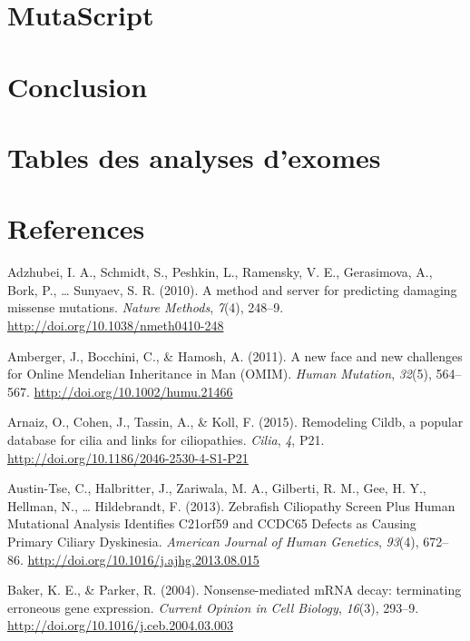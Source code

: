 \documentclass[12pt,twoside]{reedthesis}
\theoremstyle{definition}
\theoremstyle{definition}
\theoremstyle{remark}
\begin{document}
  \chapter{MutaScript}\label{mutascript}
  
  \chapter*{Conclusion}\label{conclusion-1}
  
  \chapter{Tables des analyses d'exomes}\label{sssdd}
  
  \chapter*{References}\label{references}
  
  \hypertarget{refs}{}
  \hypertarget{ref-Adzhubei2010}{}
  Adzhubei, I. A., Schmidt, S., Peshkin, L., Ramensky, V. E., Gerasimova,
  A., Bork, P., \ldots{} Sunyaev, S. R. (2010). A method and server for
  predicting damaging missense mutations. \emph{Nature Methods},
  \emph{7}(4), 248--9. \url{http://doi.org/10.1038/nmeth0410-248}
  
  \hypertarget{ref-Amberger2011}{}
  Amberger, J., Bocchini, C., \& Hamosh, A. (2011). A new face and new
  challenges for Online Mendelian Inheritance in Man (OMIM). \emph{Human
  Mutation}, \emph{32}(5), 564--567.
  \url{http://doi.org/10.1002/humu.21466}
  
  \hypertarget{ref-Arnaiz2015}{}
  Arnaiz, O., Cohen, J., Tassin, A., \& Koll, F. (2015). Remodeling Cildb,
  a popular database for cilia and links for ciliopathies. \emph{Cilia},
  \emph{4}, P21. \url{http://doi.org/10.1186/2046-2530-4-S1-P21}
  
  \hypertarget{ref-Austin-Tse2013}{}
  Austin-Tse, C., Halbritter, J., Zariwala, M. A., Gilberti, R. M., Gee,
  H. Y., Hellman, N., \ldots{} Hildebrandt, F. (2013). Zebrafish
  Ciliopathy Screen Plus Human Mutational Analysis Identifies C21orf59 and
  CCDC65 Defects as Causing Primary Ciliary Dyskinesia. \emph{American
  Journal of Human Genetics}, \emph{93}(4), 672--86.
  \url{http://doi.org/10.1016/j.ajhg.2013.08.015}
  
  \hypertarget{ref-Baker2004}{}
  Baker, K. E., \& Parker, R. (2004). Nonsense-mediated mRNA decay:
  terminating erroneous gene expression. \emph{Current Opinion in Cell
  Biology}, \emph{16}(3), 293--9.
  \url{http://doi.org/10.1016/j.ceb.2004.03.003}
  
\end{document}
